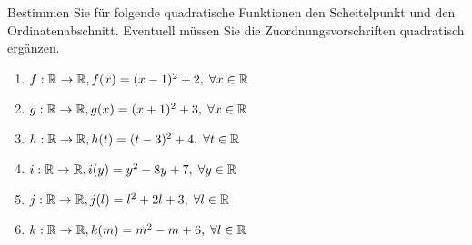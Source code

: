 \documentclass[12pt]{article}
\begin{document}
\begin{exercise}
Bestimmen Sie für folgende quadratische Funktionen den Scheitelpunkt und den Ordinatenabschnitt. Eventuell müssen Sie die Zuordnungsvorschriften quadratisch ergänzen.
\begin{enumerate}[label=\alph*)]
\item $f: \mathbb{R} \rightarrow \mathbb{R}, f(x) = (x-1)^2 + 2, \; \forall x \in \mathbb{R}$
\item $g: \mathbb{R} \rightarrow \mathbb{R}, g(x) = (x+1)^2 + 3, \; \forall x \in \mathbb{R}$
\item $h: \mathbb{R} \rightarrow \mathbb{R}, h(t) = (t-3)^2 + 4, \; \forall t \in \mathbb{R}$
\item $i: \mathbb{R} \rightarrow \mathbb{R}, i(y) = y^2 - 8y + 7, \; \forall y \in \mathbb{R}$
\item $j: \mathbb{R} \rightarrow \mathbb{R}, j(l) = l^2 + 2l + 3, \; \forall l \in \mathbb{R}$
\item $k: \mathbb{R} \rightarrow \mathbb{R}, k(m) = m^2 - m + 6, \; \forall l \in \mathbb{R}$
\end{enumerate} 
\end{exercise}
\end{document}
